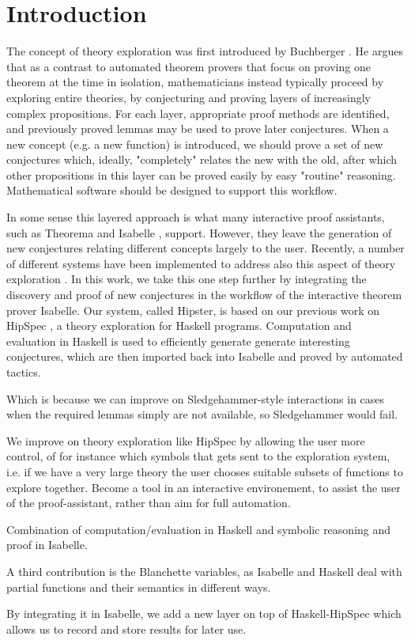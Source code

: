 \section{Introduction}
\label{sec:intro}
The concept of theory exploration was first introduced by Buchberger \cite{buchberger2000theory}. He argues that as a contrast to  automated theorem provers that focus on proving one theorem at the time in isolation, mathematicians instead typically proceed by exploring entire theories, by conjecturing and proving layers of increasingly complex propositions. For each layer, appropriate proof methods are identified, and previously proved lemmas may be used to prove later conjectures. When a new concept (e.g. a new function) is introduced, we should prove a set of new conjectures which, ideally, "completely" relates the new with the old, after which other propositions in this layer can be proved easily by easy "routine" reasoning. Mathematical software should be designed to support this workflow.

In some sense this layered approach is what many interactive proof assistants, such as Theorema \cite{theorema} and Isabelle \cite{isabelle}, support. However, they leave the generation of new conjectures relating different concepts largely to the user. Recently, a number of different systems have been implemented to address also this aspect of theory exploration \cite{McCasland2006,isacosy,isascheme,hipspecCADE}.  In this work, we take this one step further by integrating the discovery and proof of new conjectures in the workflow of the interactive theorem prover Isabelle. Our system, called Hipster, is based on our previous work on HipSpec \cite{hipspecCADE}, a theory exploration for Haskell programs. Computation and evaluation in Haskell is used to efficiently generate generate interesting conjectures, which are then imported back into Isabelle and proved by automated tactics. 



  


Which is because we can improve on Sledgehammer-style interactions in cases when the required lemmas simply are not available, so Sledgehammer would fail. 


We improve on theory exploration like HipSpec by allowing the user more control, of for instance which symbols that gets sent to the exploration system, i.e. if we have a very large theory the user chooses suitable subsets of functions to explore together. Become a tool in an interactive environement, to assist the user of the proof-assistant, rather than aim for full automation.

Combination of computation/evaluation in Haskell and symbolic reasoning and proof in Isabelle.

A third contribution is the Blanchette variables, as Isabelle and Haskell deal with partial functions and their semantics in different ways.  

By integrating it in Isabelle, we add a new layer on top of Haskell-HipSpec which allows us to record and store results for later use.

